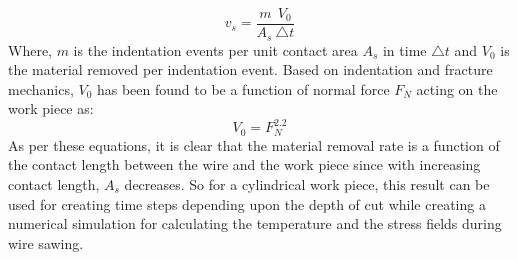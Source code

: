 \begin{equation}
v_{s} =  \frac{m \ \ V_{0}}{A_{s} \  \triangle t}
\label {cr-slip}
\end{equation}
\newline
Where, $m$ is the indentation events per unit contact area $A_{s}$ in time $\triangle t$ and $V_{0}$ is the material removed per indentation event. Based on indentation and fracture mechanics, $V_{0}$ has been found to be a function of normal force $F_{N}$ acting on the work piece as:
\begin{equation}
V_{0} = F^{2.2}_{N}
\label {cr-slip}
\end{equation}
\newline
As per these equations, it is clear that the material removal rate is a function of the contact length between the wire and the work piece since with increasing contact length, $A_{s}$ decreases. So for a cylindrical work piece, this result can be used for creating time steps depending upon the depth of cut while creating a numerical simulation for calculating the temperature and the stress fields during wire sawing.


